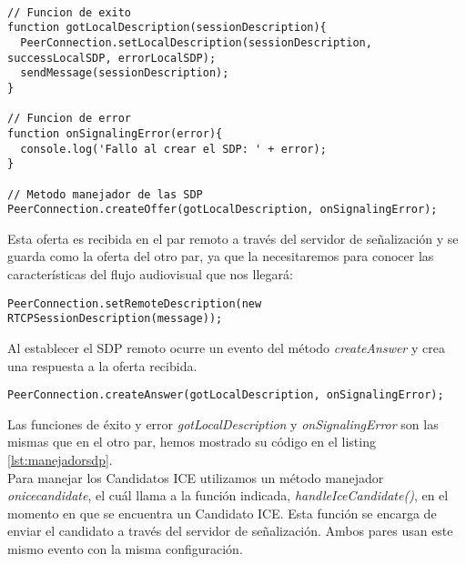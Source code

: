 \begin{lstlisting}[caption={Manejandor de los SDP.}, label={lst:manejadorsdp}]

// Funcion de exito
function gotLocalDescription(sessionDescription){
  PeerConnection.setLocalDescription(sessionDescription, successLocalSDP, errorLocalSDP);
  sendMessage(sessionDescription);
}

// Funcion de error
function onSignalingError(error){
  console.log('Fallo al crear el SDP: ' + error);	
}

// Metodo manejador de las SDP
PeerConnection.createOffer(gotLocalDescription, onSignalingError);

\end{lstlisting}

Esta oferta es recibida en el par remoto a través del servidor de señalización y se guarda como la oferta del otro par, ya que la necesitaremos para conocer las características del flujo audiovisual que nos llegará:\\


\begin{lstlisting}[caption={Estableciendo SDP del par remoto.}]
PeerConnection.setRemoteDescription(new RTCPSessionDescription(message));
\end{lstlisting}

Al establecer el SDP remoto ocurre un evento del método \emph{createAnswer} y crea una respuesta a la oferta recibida.\\

\begin{lstlisting}[caption=Manejandor de respuestas SDP]
PeerConnection.createAnswer(gotLocalDescription, onSignalingError);
\end{lstlisting}


Las funciones de éxito y error \emph{gotLocalDescription} y \emph{onSignalingError} son las mismas que en el otro par, hemos mostrado su código en el listing \ref{lst:manejadorsdp}.\\

Para manejar los Candidatos ICE utilizamos un método manejador \emph{onicecandidate}, el cuál llama a la función indicada, \emph{handleIceCandidate()}, en el momento en que se encuentra un Candidato ICE. Esta función se encarga de enviar el candidato a través del servidor de señalización. Ambos pares usan este mismo evento con la misma configuración.\\

